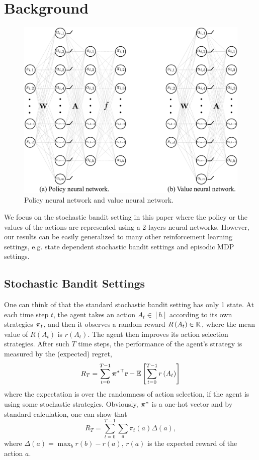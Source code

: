 \section{Background}
\label{sec:background}

\begin{figure}[t]
	\begin{center}
		\centerline{\includegraphics[width=0.7\columnwidth]{nn_policy_value_vertical.pdf}}
		\caption{Policy neural network and value neural network.}
		\label{fig:nn_policy_value}
	\end{center}
	\vskip -0.2in
\end{figure}

We focus on the stochastic bandit setting in this paper where the policy or the values of the actions are represented using a 2-layers neural networks.  
However, our results can be easily generalized to many other reinforcement learning settings, e.g. state dependent stochastic bandit settings and episodic MDP settings.

\subsection{Stochastic Bandit Settings}
\label{subsec:settings}

One can think of that the standard stochastic bandit setting has only 1 state.  
At each time step $t$, the agent takes an action $A_t \in [h]$ according to its own strategies ${\boldsymbol{\pi}}_t$, and then it observes a random reward $R\left(A_t\right) \in {\mathbb{R}}$, where the mean value of $R\left(A_t\right)$ is $r\left(A_t\right)$. 
The agent then improves its action selection strategies. 
After such $T$ time steps, the performance of the agent's strategy is measured by the (expected) regret,
\begin{equation}
\label{eq:expected_regret}
R_T = \sum\limits_{t=0}^{T-1}{{{\boldsymbol{\pi}}^*}^\top {\mathbf{r}}} - {\mathbb{E}} \left[ \sum\limits_{t=0}^{T-1}{  r\left(A_t\right)  } \right] 
\end{equation}
where the expectation is over the randomness of action selection, if the agent is using some stochastic strategies.
Obviously, ${\boldsymbol{\pi}}^*$ is a one-hot vector and by standard calculation, one can show that
\[
R_T = \sum_{t=0}^{T-1} \sum_a \pi_t(a) \Delta(a),
\]
where $\Delta(a) = \max_b r(b)- r(a)$, $r(a)$ is the expected reward of the action $a$.

